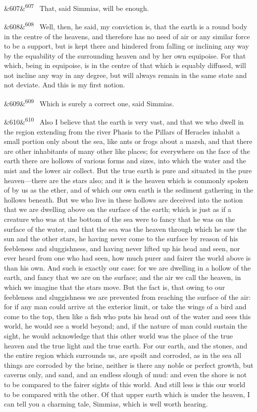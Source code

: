 \documentclass[12pt]{article}
\newcommand{\para}[1][]{\par\noindent\ifx&#1&\else\textsuperscript{\footnotesize #1}~\fi}
\begin{document}
\para[607] That, said Simmias, will be enough.

\para[608] Well, then, he said, my conviction is, that the earth is a round body in the centre of the heavens, and therefore has no need of air or any similar force to be a support, but is kept there and hindered from falling or inclining any way by the equability of the surrounding heaven and by her own equipoise. For that which, being in equipoise, is in the centre of that which is equably diffused, will not incline any way in any degree, but will always remain in the same state and not deviate. And this is my first notion.

\para[609] Which is surely a correct one, said Simmias.

\para[610] Also I believe that the earth is very vast, and that we who dwell in the region extending from the river Phasis to the Pillars of Heracles inhabit a small portion only about the sea, like ants or frogs about a marsh, and that there are other inhabitants of many other like places; for everywhere on the face of the earth there are hollows of various forms and sizes, into which the water and the mist and the lower air collect. But the true earth is pure and situated in the pure heaven---there are the stars also; and it is the heaven which is commonly spoken of by us as the ether, and of which our own earth is the sediment gathering in the hollows beneath. But we who live in these hollows are deceived into the notion that we are dwelling above on the surface of the earth; which is just as if a creature who was at the bottom of the sea were to fancy that he was on the surface of the water, and that the sea was the heaven through which he saw the sun and the other stars, he having never come to the surface by reason of his feebleness and sluggishness, and having never lifted up his head and seen, nor ever heard from one who had seen, how much purer and fairer the world above is than his own. And such is exactly our case: for we are dwelling in a hollow of the earth, and fancy that we are on the surface; and the air we call the heaven, in which we imagine that the stars move. But the fact is, that owing to our feebleness and sluggishness we are prevented from reaching the surface of the air: for if any man could arrive at the exterior limit, or take the wings of a bird and come to the top, then like a fish who puts his head out of the water and sees this world, he would see a world beyond; and, if the nature of man could sustain the sight, he would acknowledge that this other world was the place of the true heaven and the true light and the true earth. For our earth, and the stones, and the entire region which surrounds us, are spoilt and corroded, as in the sea all things are corroded by the brine, neither is there any noble or perfect growth, but caverns only, and sand, and an endless slough of mud: and even the shore is not to be compared to the fairer sights of this world. And still less is this our world to be compared with the other. Of that upper earth which is under the heaven, I can tell you a charming tale, Simmias, which is well worth hearing.
\end{document}

